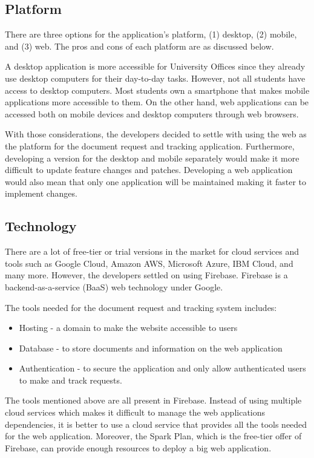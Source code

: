 \subsection{Platform}
There are three options for the application’s platform, (1) desktop, (2) mobile, and (3) web. The pros and cons of each platform are as discussed below.

A desktop application is more accessible for University Offices since they already use desktop computers for their day-to-day tasks. However, not all students have access to desktop computers. Most students own a smartphone that makes mobile applications more accessible to them. On the other hand, web applications can be accessed both on mobile devices and desktop computers through web browsers.

With those considerations, the developers decided to settle with using the web as the platform for the document request and tracking application. Furthermore, developing a version for the desktop and mobile separately would make it more difficult to update feature changes and patches. Developing a web application would also mean that only one application will be maintained making it faster to implement changes.
\subsection{Technology}
There are a lot of free-tier or trial versions in the market for cloud services and tools such as Google Cloud, Amazon AWS, Microsoft Azure, IBM Cloud, and many more. However, the developers settled on using Firebase. Firebase is a backend-as-a-service (BaaS) web technology under Google.

The tools needed for the document request and tracking system includes:
\begin{itemize}
   \item Hosting - a domain to make the website accessible to users
   \item Database - to store documents and information on the web application
   \item Authentication - to secure the application and only allow authenticated users to make and track requests.
\end{itemize}

The tools mentioned above are all present in Firebase. Instead of using multiple cloud services which makes it difficult to manage the web applications dependencies, it is better to use a cloud service that provides all the tools needed for the web application. Moreover, the Spark Plan, which is the free-tier offer of Firebase, can provide enough resources to deploy a big web application.

